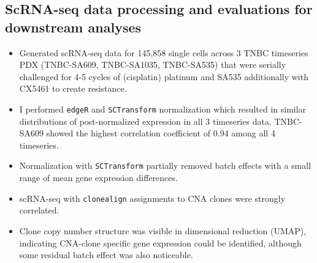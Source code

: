   \subsection{ScRNA-seq data processing and evaluations for downstream analyses} 
\begin{itemize}
  
   \item Generated scRNA-seq data for 145,858 single cells across 3 TNBC timeseries PDX 
(TNBC-SA609, TNBC-SA1035, TNBC-SA535) that were serially challenged for 4-5 cycles of (cisplatin) platinum and SA535 additionally with CX5461 to create resistance.
   \item I performed  \texttt{edgeR} and \texttt{SCTransform}  normalization which resulted in similar distributions of post-normalized expression in all 3 timeseries data. TNBC-SA609 showed the highest correlation coefficient of 0.94 among all 4 timeseries.
 
 \item Normalization with \texttt{SCTransform} partially removed batch effects with a small range of mean gene expression differences.

 \item scRNA-seq with \texttt{clonealign} assignments to CNA clones were strongly correlated.
 
 \item Clone copy number structure was visible in dimensional reduction (UMAP), indicating CNA-clone specific gene expression could be identified, although some residual batch effect was also noticeable.

\end{itemize}
